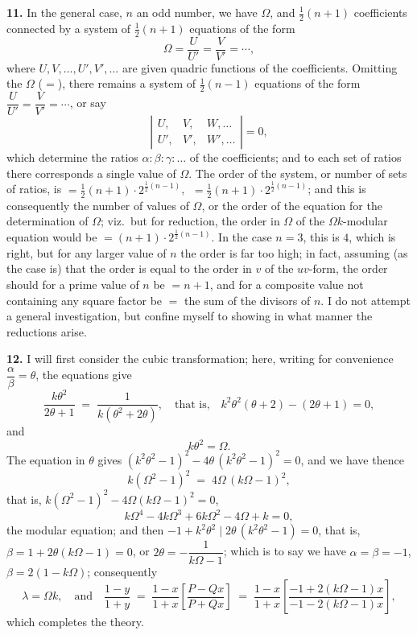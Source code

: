 \documentclass[11pt]{article}
\begin{document}
\textbf{11.} In the general case, $n$ an odd number, we have $\Omega$, and
$\tfrac{1}{2}(n+1)$ coefficients connected by a system of $\tfrac{1}{2}(n+1)$
equations of the form
\[
\Omega = \frac{U}{U'} = \frac{V}{V'} = \cdots,
\]
where $U, V,\ldots, U', V',\ldots$ are given quadric functions of the
coefficients. Omitting the $\Omega$ ($=$), there remains a system of
$\tfrac{1}{2}(n-1)$ equations of the form $\dfrac{U}{U'} = \dfrac{V}{V'} = \cdots$,
or say
\[
\left|\begin{array}{ccc} U, & V, & W,\ldots \\ U', & V', & W',\ldots \end{array}\right| = 0,
\]
which determine the ratios $\alpha:\beta:\gamma:\ldots$ of the coefficients;
and to each set of ratios there corresponds a single value of $\Omega$. The
order of the system, or number of sets of ratios, is
$=\tfrac{1}{2}(n+1)\cdot 2^{\frac{1}{2}(n-1)}$,
$\;=\tfrac{1}{2}(n+1)\cdot 2^{\frac{1}{2}(n-1)}$;
and this is consequently the number of values of $\Omega$, or the order
of the equation for the determination of $\Omega$; viz.\ but for reduction,
the order in $\Omega$ of the $\Omega k$-modular equation would be
$= (n+1)\cdot 2^{\frac{1}{2}(n-1)}$. In the case $n=3$, this is $4$, which
is right, but for any larger value of $n$ the order is far too high; in
fact, assuming (as the case is) that the order is equal to the order in
$v$ of the $uv$-form, the order should for a prime value of $n$ be
$=n+1$, and for a composite value not containing any square factor be
$=$ the sum of the divisors of $n$. I do not attempt a general
investigation, but confine myself to showing in what manner the
reductions arise.

\medskip
\textbf{12.} I will first consider the cubic transformation; here, writing
for convenience $\dfrac{\alpha}{\beta} = \theta$, the equations give
\[
\frac{k\theta^2}{2\theta+1} \;=\; \frac{1}{k(\theta^2+2\theta)},
\quad\text{that is,}\quad k^2\theta^2(\theta+2) - (2\theta+1) = 0,
\]
and
\[
k\theta^2 = \Omega.
\]
The equation in $\theta$ gives $(k^2\theta^2 - 1)^2 - 4\theta\,(k^2\theta^2 - 1)^2 = 0$,
and we have thence
\[
k(\Omega^2 - 1)^2 \;=\; 4\Omega\,(k\Omega - 1)^2,
\]
that is, $k(\Omega^2-1)^2 - 4\Omega(k\Omega-1)^2 = 0$,
\[
k\Omega^4 - 4k\Omega^3 + 6k\Omega^2 - 4\Omega + k = 0,
\]
the modular equation; and then $-1 + k^2\theta^2 \mid 2\theta\,(k^2\theta^2 - 1) = 0$,
that is, $\beta = 1 + 2\theta(k\Omega - 1) = 0$, or $2\theta = -\dfrac{1}{k\Omega - 1}$;
which is to say we have $\alpha=\beta=-1$, $\beta = 2(1-k\Omega)$; consequently
\[
\lambda = \Omega k,\quad\text{and}\quad
\frac{1-y}{1+y} \;=\; \frac{1-x}{1+x}\!\left[\frac{P - Q x}{P + Q x}\right]
\;=\; \frac{1-x}{1+x}\!\left[\frac{-1 + 2(k\Omega - 1)x}{-1 - 2(k\Omega - 1)x}\right],
\]
which completes the theory.
\end{document}
